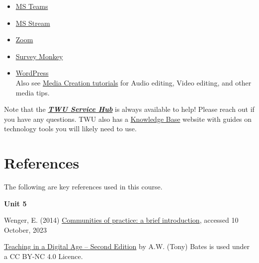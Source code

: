 \documentclass[
]{book}
\providecommand{\tightlist}{%
  \setlength{\itemsep}{0pt}\setlength{\parskip}{0pt}}
\theoremstyle{definition}
\theoremstyle{definition}
\theoremstyle{definition}
\theoremstyle{definition}
\theoremstyle{remark}
\begin{document}
\begin{itemize}
\tightlist
\item
  \href{https://trinitywestern.teamdynamix.com/TDClient/1904/Portal/KB/?CategoryID=17821\&SIDs=11353}{MS Teams}\\
\item
  \href{https://trinitywestern.teamdynamix.com/TDClient/1904/Portal/KB/?CategoryID=23454}{MS Stream}\\
\item
  \href{https://trinitywestern.teamdynamix.com/TDClient/1904/Portal/KB/?CategoryID=17478}{Zoom}\\
\item
  \href{https://trinitywestern.teamdynamix.com/TDClient/1904/Portal/KB/ArticleDet?ID=47076}{Survey Monkey}\\
\item
  \href{https://trinitywestern.teamdynamix.com/TDClient/1904/Portal/KB/?CategoryID=4746}{WordPress}\\
  Also see \href{https://trinitywestern.teamdynamix.com/TDClient/1904/Portal/KB/?CategoryID=6940}{Media Creation tutorials} for Audio editing, Video editing, and other media tips.
\end{itemize}

\begin{feedback}
Note that the
\href{https://trinitywestern.teamdynamix.com/TDClient/1904/Portal/KB/ArticleDet?ID=16267}{\textbf{\emph{TWU
Service Hub}}} is always available to help! Please reach out if you have
any questions. TWU also has a
\href{https://trinitywestern.teamdynamix.com/TDClient/1904/Portal/KB/}{Knowledge
Base} website with guides on technology tools you will likely need to
use.
\end{feedback}

\hypertarget{references}{%
\chapter*{References}\label{references}}

The following are key references used in this course.

\textbf{Unit 5}

Wenger, E. (2014) \href{https://www.wenger-trayner.com/introduction-to-communities-of-practice/}{Communities of practice: a brief introduction}, accessed 10 October, 2023

\href{https://pressbooks.bccampus.ca/teachinginadigitalagev2/}{Teaching in a Digital Age -- Second Edition} by A.W. (Tony) Bates is used under a CC BY-NC 4.0 Licence.
\end{document}
